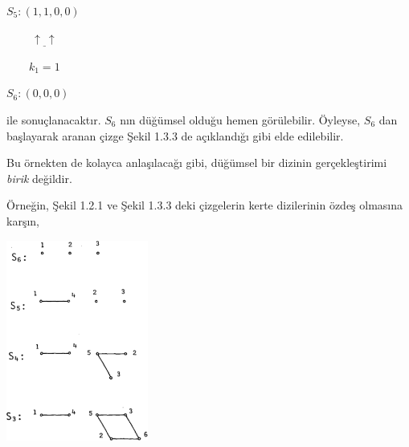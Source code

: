 \documentclass[11pt]{amsbook}
\begin{document}

$S_5: (1,1,0,0)$

$\qquad \ \underline{\uparrow \ \uparrow}$

$\qquad k_1 = 1$

$S_6: (0,0,0)$

ile sonuçlanacaktır. $S_6$ nın düğümsel olduğu hemen görülebilir. Öyleyse, $S_6$ dan başlayarak aranan çizge Şekil 1.3.3 de açıklandığı gibi elde edilebilir. 

Bu örnekten de kolayca anlaşılacağı gibi, düğümsel bir dizinin gerçekleştirimi \textit{birik} değildir.

Örneğin, Şekil 1.2.1 ve Şekil 1.3.3 deki çizgelerin kerte dizilerinin özdeş olmasına karşın, 

	\begin{center}
    \includegraphics[width=0.35\textwidth]{images/ceyhun-025-fig01}
	\end{center}
\end{document}

